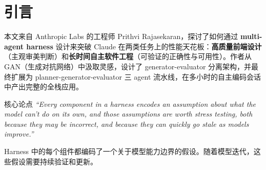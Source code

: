 \section{引言}

本文来自 Anthropic Labs 的工程师 Prithvi Rajasekaran，探讨了如何通过 \textbf{multi-agent harness} 设计来突破 Claude 在两类任务上的性能天花板：\textbf{高质量前端设计}（主观审美判断）和\textbf{长时间自主软件工程}（可验证的正确性与可用性）。作者从 GAN（生成对抗网络）中汲取灵感，设计了 generator-evaluator 分离架构，并最终扩展为 planner-generator-evaluator 三 agent 流水线，在多小时的自主编码会话中产出完整的全栈应用。

\begin{importantbox}{核心论点}
\textit{``Every component in a harness encodes an assumption about what the model can't do on its own, and those assumptions are worth stress testing, both because they may be incorrect, and because they can quickly go stale as models improve.''}

Harness 中的每个组件都编码了一个关于模型能力边界的假设。随着模型迭代，这些假设需要持续验证和更新。
\end{importantbox}

